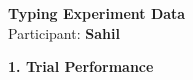 \documentclass[10pt,a4paper]{article}
\begin{document}

\begin{center}
    {\Large\bfseries Typing Experiment Data}\\
    \vspace{2pt}
    Participant: \textbf{Sahil}
\end{center}

\vspace{0.25cm}


\noindent
{\large\bfseries 1. Trial Performance}

\vspace{0.08cm}
\end{document}
